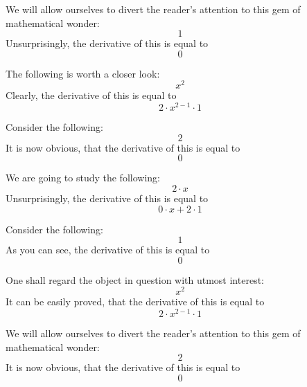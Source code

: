 \documentclass{article}
\begin{document}
We will allow ourselves to divert the reader's attention to this gem of mathematical wonder:
\begin{equation}
1 
\end{equation}
Unsurprisingly, the derivative of this is equal to
\begin{equation}
0 
\end{equation}

The following is worth a closer look:
\begin{equation}
x ^{2 } 
\end{equation}
Clearly, the derivative of this is equal to
\begin{equation}
2 \cdot x ^{2 - 1 } \cdot 1 
\end{equation}

Consider the following:
\begin{equation}
2 
\end{equation}
It is now obvious, that the derivative of this is equal to
\begin{equation}
0 
\end{equation}

We are going to study the following:
\begin{equation}
2 \cdot x 
\end{equation}
Unsurprisingly, the derivative of this is equal to
\begin{equation}
0 \cdot x + 2 \cdot 1 
\end{equation}

Consider the following:
\begin{equation}
1 
\end{equation}
As you can see, the derivative of this is equal to
\begin{equation}
0 
\end{equation}

One shall regard the object in question with utmost interest:
\begin{equation}
x ^{2 } 
\end{equation}
It can be easily proved, that the derivative of this is equal to
\begin{equation}
2 \cdot x ^{2 - 1 } \cdot 1 
\end{equation}

We will allow ourselves to divert the reader's attention to this gem of mathematical wonder:
\begin{equation}
2 
\end{equation}
It is now obvious, that the derivative of this is equal to
\begin{equation}
0 
\end{equation}
\end{document}
